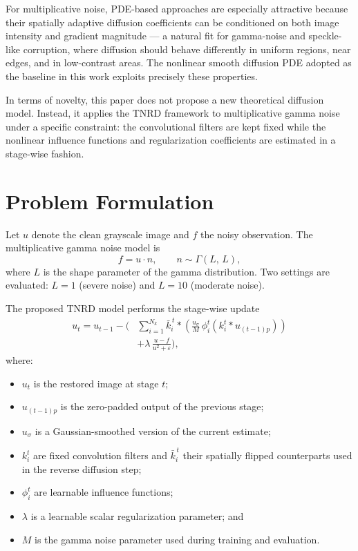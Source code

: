 \documentclass[conference]{IEEEtran}
\begin{document}
For multiplicative noise, PDE-based approaches are especially attractive because
their spatially adaptive diffusion coefficients can be conditioned on both image
intensity and gradient magnitude --- a natural fit for gamma-noise and speckle-like
corruption, where diffusion should behave differently in uniform regions, near
edges, and in low-contrast areas. The nonlinear smooth diffusion PDE adopted as the
baseline in this work exploits precisely these properties.

In terms of novelty, this paper does not propose a new theoretical diffusion model.
Instead, it applies the TNRD framework to multiplicative gamma noise under a
specific constraint: the convolutional filters are kept fixed while the nonlinear
influence functions and regularization coefficients are estimated in a stage-wise
fashion.

\section{Problem Formulation}
Let $u$ denote the clean grayscale image and $f$ the noisy observation. The
multiplicative gamma noise model is
\begin{equation}
  f = u \cdot n, \qquad n \sim \Gamma(L,\,L),
  \label{eq:noise_model}
\end{equation}
where $L$ is the shape parameter of the gamma distribution. Two settings are
evaluated: $L=1$ (severe noise) and $L=10$ (moderate noise).

The proposed TNRD model performs the stage-wise update
\begin{align}
  u_t = u_{t-1} - \Bigg(
    &\sum_{i=1}^{N_k} \bar{k}_i^{\,t} * \!\left(
        \frac{u_\sigma}{M}\,\phi_i^t\!\left(k_i^t * u_{(t-1)p}\right)
      \right) \nonumber \\
    &+ \lambda\,\frac{u - f}{u^2 + \varepsilon}
  \Bigg),
  \label{eq:tnrd_update}
\end{align}
where:
\begin{itemize}
  \item $u_t$ is the restored image at stage $t$;
  \item $u_{(t-1)p}$ is the zero-padded output of the previous stage;
  \item $u_\sigma$ is a Gaussian-smoothed version of the current estimate;
  \item $k_i^t$ are fixed convolution filters and $\bar{k}_i^{\,t}$ their
        spatially flipped counterparts used in the reverse diffusion step;
  \item $\phi_i^t$ are learnable influence functions;
  \item $\lambda$ is a learnable scalar regularization parameter; and
  \item $M$ is the gamma noise parameter used during training and evaluation.
\end{itemize}
\end{document}
